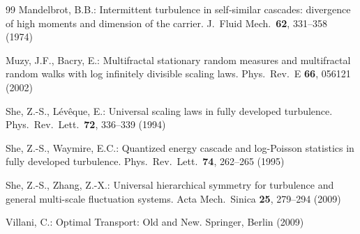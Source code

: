 \documentclass[pdflatex,sn-mathphys-num]{sn-jnl}
\theoremstyle{thmstyleone}
\theoremstyle{thmstyletwo}
\theoremstyle{thmstylethree}
\begin{document}
\begin{thebibliography}{99}
Mandelbrot, B.B.:
Intermittent turbulence in self-similar cascades: divergence of high
moments and dimension of the carrier.
J.\ Fluid Mech.\ \textbf{62}, 331--358 (1974)

Muzy, J.F., Bacry, E.:
Multifractal stationary random measures and multifractal random
walks with log infinitely divisible scaling laws.
Phys.\ Rev.\ E \textbf{66}, 056121 (2002)

She, Z.-S., L\'ev\^eque, E.:
Universal scaling laws in fully developed turbulence.
Phys.\ Rev.\ Lett.\ \textbf{72}, 336--339 (1994)

She, Z.-S., Waymire, E.C.:
Quantized energy cascade and log-Poisson statistics in fully
developed turbulence.
Phys.\ Rev.\ Lett.\ \textbf{74}, 262--265 (1995)

She, Z.-S., Zhang, Z.-X.:
Universal hierarchical symmetry for turbulence and general multi-scale
fluctuation systems.
Acta Mech.\ Sinica \textbf{25}, 279--294 (2009)

Villani, C.:
Optimal Transport: Old and New.
Springer, Berlin (2009)

\end{thebibliography}
\end{document}
